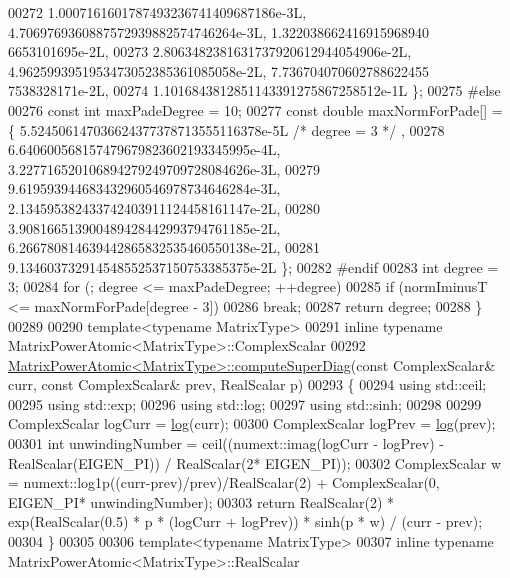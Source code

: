 \begin{DoxyCode}
00272       1.0007161601787493236741409687186e-3L, 4.7069769360887572939882574746264e-3L, 1.322038662416915968940
      6653101695e-2L,
00273       2.8063482381631737920612944054906e-2L, 4.9625993951953473052385361085058e-2L, 7.736704070602788622455
      7538328171e-2L,
00274       1.1016843812851143391275867258512e-1L \};
00275 \textcolor{preprocessor}{#else}
00276   \textcolor{keyword}{const} \textcolor{keywordtype}{int} maxPadeDegree = 10;
00277   \textcolor{keyword}{const} \textcolor{keywordtype}{double} maxNormForPade[] = \{ 5.524506147036624377378713555116378e-5L \textcolor{comment}{/* degree = 3 */} ,
00278       6.640600568157479679823602193345995e-4L, 3.227716520106894279249709728084626e-3L,
00279       9.619593944683432960546978734646284e-3L, 2.134595382433742403911124458161147e-2L,
00280       3.908166513900489428442993794761185e-2L, 6.266780814639442865832535460550138e-2L,
00281       9.134603732914548552537150753385375e-2L \};
00282 \textcolor{preprocessor}{#endif}
00283   \textcolor{keywordtype}{int} degree = 3;
00284   \textcolor{keywordflow}{for} (; degree <= maxPadeDegree; ++degree)
00285     \textcolor{keywordflow}{if} (normIminusT <= maxNormForPade[degree - 3])
00286       \textcolor{keywordflow}{break};
00287   \textcolor{keywordflow}{return} degree;
00288 \}
00289 
00290 \textcolor{keyword}{template}<\textcolor{keyword}{typename} MatrixType>
00291 \textcolor{keyword}{inline} \textcolor{keyword}{typename} MatrixPowerAtomic<MatrixType>::ComplexScalar
00292 \hyperlink{class_eigen_1_1_matrix_power_atomic}{MatrixPowerAtomic<MatrixType>::computeSuperDiag}(\textcolor{keyword}{const} 
      ComplexScalar& curr, \textcolor{keyword}{const} ComplexScalar& prev, RealScalar p)
00293 \{
00294   \textcolor{keyword}{using} std::ceil;
00295   \textcolor{keyword}{using} std::exp;
00296   \textcolor{keyword}{using} std::log;
00297   \textcolor{keyword}{using} std::sinh;
00298 
00299   ComplexScalar logCurr = \hyperlink{structlog}{log}(curr);
00300   ComplexScalar logPrev = \hyperlink{structlog}{log}(prev);
00301   \textcolor{keywordtype}{int} unwindingNumber = ceil((numext::imag(logCurr - logPrev) - RealScalar(EIGEN\_PI)) / RealScalar(2*
      EIGEN\_PI));
00302   ComplexScalar w = numext::log1p((curr-prev)/prev)/RealScalar(2) + ComplexScalar(0, EIGEN\_PI*
      unwindingNumber);
00303   \textcolor{keywordflow}{return} RealScalar(2) * exp(RealScalar(0.5) * p * (logCurr + logPrev)) * sinh(p * w) / (curr - prev);
00304 \}
00305 
00306 \textcolor{keyword}{template}<\textcolor{keyword}{typename} MatrixType>
00307 \textcolor{keyword}{inline} \textcolor{keyword}{typename} MatrixPowerAtomic<MatrixType>::RealScalar

\end{DoxyCode}
